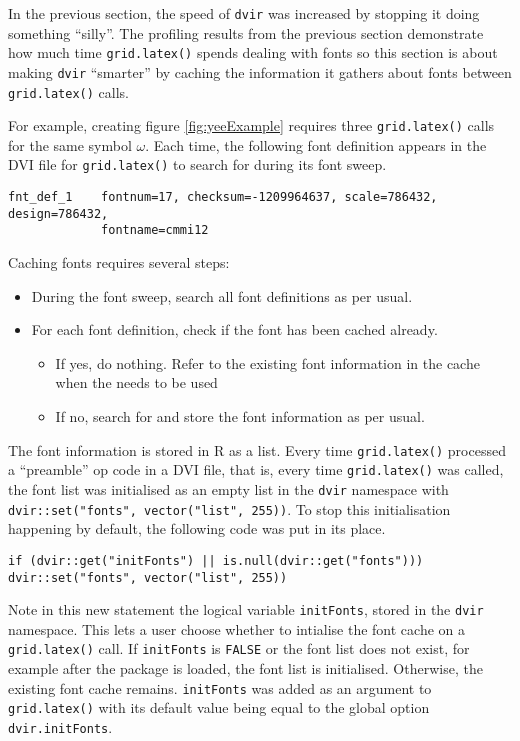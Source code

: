 \documentclass[]{article}
\begin{document}
In the previous section, the speed of \texttt{dvir} was increased by
stopping it doing something ``silly''. The profiling results from the
previous section demonstrate how much time \texttt{grid.latex()} spends
dealing with fonts so this section is about making \texttt{dvir}
``smarter'' by caching the information it gathers about fonts between
\texttt{grid.latex()} calls.

For example, creating figure \ref{fig:yeeExample} requires three
\texttt{grid.latex()} calls for the same symbol \(\omega\). Each time,
the following font definition appears in the DVI file for
\texttt{grid.latex()} to search for during its font sweep.

\begin{verbatim}
fnt_def_1    fontnum=17, checksum=-1209964637, scale=786432, design=786432,
             fontname=cmmi12
\end{verbatim}

Caching fonts requires several steps:

\begin{itemize}
  \item During the font sweep, search all font definitions as per usual.
  \item For each font definition, check if the font has been cached already.
  \begin{itemize}
    \item If yes, do nothing. Refer to the existing font information in the cache when the needs to be used
    \item If no, search for and store the font information as per usual.
  \end{itemize}
\end{itemize}

The font information is stored in R as a list. Every time
\texttt{grid.latex()} processed a ``preamble'' op code in a DVI file,
that is, every time \texttt{grid.latex()} was called, the font list was
initialised as an empty list in the \texttt{dvir} namespace with
\texttt{dvir::set("fonts",\ vector("list",\ 255))}. To stop this
initialisation happening by default, the following code was put in its
place.

\begin{verbatim}
if (dvir::get("initFonts") || is.null(dvir::get("fonts"))) dvir::set("fonts", vector("list", 255))
\end{verbatim}

Note in this new statement the logical variable \texttt{initFonts},
stored in the \texttt{dvir} namespace. This lets a user choose whether
to intialise the font cache on a \texttt{grid.latex()} call. If
\texttt{initFonts} is \texttt{FALSE} or the font list does not exist,
for example after the package is loaded, the font list is initialised.
Otherwise, the existing font cache remains. \texttt{initFonts} was added
as an argument to \texttt{grid.latex()} with its default value being
equal to the global option \texttt{dvir.initFonts}.
\end{document}
